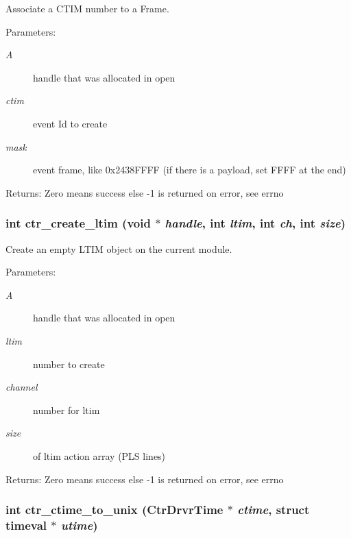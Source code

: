 Associate a CTIM number to a Frame. 

\begin{Desc}
\item[Parameters:]
\begin{description}
\item[{\em A}]handle that was allocated in open \item[{\em ctim}]event Id to create \item[{\em mask}]event frame, like 0x2438FFFF (if there is a payload, set FFFF at the end) \end{description}
\end{Desc}
\begin{Desc}
\item[Returns:]Zero means success else -1 is returned on error, see errno \end{Desc}
\subsubsection{\setlength{\rightskip}{0pt plus 5cm}int ctr\_\-create\_\-ltim (void $\ast$ {\em handle}, int {\em ltim}, int {\em ch}, int {\em size})}\label{libctr_8doxygen_0cf46533ac668e31829f1f8756626384}


Create an empty LTIM object on the current module. 

\begin{Desc}
\item[Parameters:]
\begin{description}
\item[{\em A}]handle that was allocated in open \item[{\em ltim}]number to create \item[{\em channel}]number for ltim \item[{\em size}]of ltim action array (PLS lines) \end{description}
\end{Desc}
\begin{Desc}
\item[Returns:]Zero means success else -1 is returned on error, see errno \end{Desc}
\subsubsection{\setlength{\rightskip}{0pt plus 5cm}int ctr\_\-ctime\_\-to\_\-unix (Ctr\-Drvr\-Time $\ast$ {\em ctime}, struct timeval $\ast$ {\em utime})}\label{libctr_8doxygen_09dc6e16cd3eadc150a487ed22f832b9}


